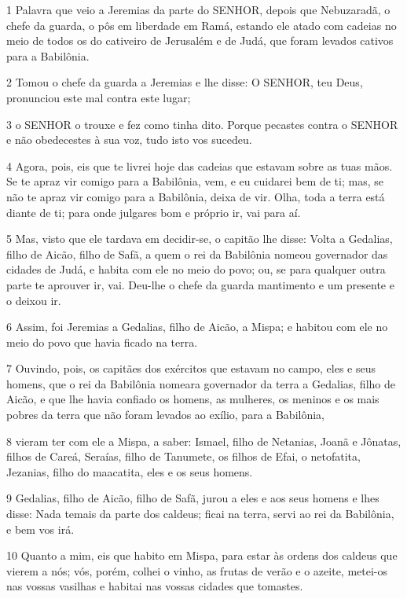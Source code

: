 \par 1 Palavra que veio a Jeremias da parte do SENHOR, depois que Nebuzaradã, o chefe da guarda, o pôs em liberdade em Ramá, estando ele atado com cadeias no meio de todos os do cativeiro de Jerusalém e de Judá, que foram levados cativos para a Babilônia.
\par 2 Tomou o chefe da guarda a Jeremias e lhe disse: O SENHOR, teu Deus, pronunciou este mal contra este lugar;
\par 3 o SENHOR o trouxe e fez como tinha dito. Porque pecastes contra o SENHOR e não obedecestes à sua voz, tudo isto vos sucedeu.
\par 4 Agora, pois, eis que te livrei hoje das cadeias que estavam sobre as tuas mãos. Se te apraz vir comigo para a Babilônia, vem, e eu cuidarei bem de ti; mas, se não te apraz vir comigo para a Babilônia, deixa de vir. Olha, toda a terra está diante de ti; para onde julgares bom e próprio ir, vai para aí.
\par 5 Mas, visto que ele tardava em decidir-se, o capitão lhe disse: Volta a Gedalias, filho de Aicão, filho de Safã, a quem o rei da Babilônia nomeou governador das cidades de Judá, e habita com ele no meio do povo; ou, se para qualquer outra parte te aprouver ir, vai. Deu-lhe o chefe da guarda mantimento e um presente e o deixou ir.
\par 6 Assim, foi Jeremias a Gedalias, filho de Aicão, a Mispa; e habitou com ele no meio do povo que havia ficado na terra.
\par 7 Ouvindo, pois, os capitães dos exércitos que estavam no campo, eles e seus homens, que o rei da Babilônia nomeara governador da terra a Gedalias, filho de Aicão, e que lhe havia confiado os homens, as mulheres, os meninos e os mais pobres da terra que não foram levados ao exílio, para a Babilônia,
\par 8 vieram ter com ele a Mispa, a saber: Ismael, filho de Netanias, Joanã e Jônatas, filhos de Careá, Seraías, filho de Tanumete, os filhos de Efai, o netofatita, Jezanias, filho do maacatita, eles e os seus homens.
\par 9 Gedalias, filho de Aicão, filho de Safã, jurou a eles e aos seus homens e lhes disse: Nada temais da parte dos caldeus; ficai na terra, servi ao rei da Babilônia, e bem vos irá.
\par 10 Quanto a mim, eis que habito em Mispa, para estar às ordens dos caldeus que vierem a nós; vós, porém, colhei o vinho, as frutas de verão e o azeite, metei-os nas vossas vasilhas e habitai nas vossas cidades que tomastes.
